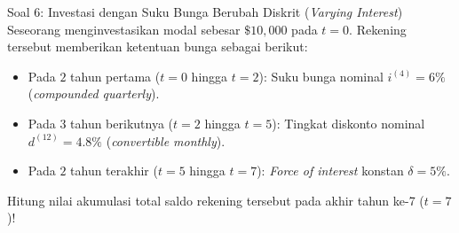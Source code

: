 \documentclass[11pt,a4paper]{article}
\begin{document}
\vspace{1.2em}

\begin{problembox}{Soal 6: Investasi dengan Suku Bunga Berubah Diskrit (\textit{Varying Interest})}
Seseorang menginvestasikan modal sebesar $\$10{,}000$ pada $t = 0$. Rekening tersebut memberikan ketentuan bunga sebagai berikut:
\begin{itemize}[leftmargin=1.5em]
    \item Pada $2$ tahun pertama ($t = 0$ hingga $t = 2$): Suku bunga nominal $i^{(4)} = 6\%$ (\textit{compounded quarterly}).
    \item Pada $3$ tahun berikutnya ($t = 2$ hingga $t = 5$): Tingkat diskonto nominal $d^{(12)} = 4.8\%$ (\textit{convertible monthly}).
    \item Pada $2$ tahun terakhir ($t = 5$ hingga $t = 7$): \textit{Force of interest} konstan $\delta = 5\%$.
\end{itemize}
Hitung nilai akumulasi total saldo rekening tersebut pada akhir tahun ke-7 ($t = 7$)!
\end{problembox}
\end{document}
